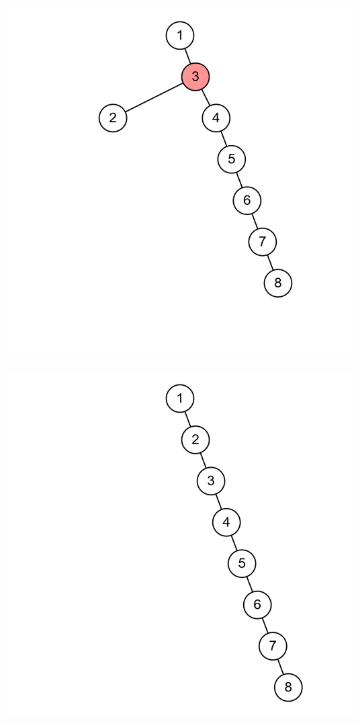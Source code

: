 \documentclass[11pt,a4paper]{article}
\begin{document}
\begin{loesung}
\begin{enumerate}
\begin{figure}[h!]
\begin{subfigure}[b]{0.23\textwidth}
            \end{subfigure}
            \begin{subfigure}[b]{0.23\textwidth}
                \centering
                \includegraphics[width=\textwidth]{img/1b/6}
            \end{subfigure}
            \begin{subfigure}[b]{0.23\textwidth}
                \centering
                \includegraphics[width=\textwidth]{img/1b/7}
            \end{subfigure}
        \end{figure}
        \FloatBarrier


\end{enumerate}
\end{loesung}
\end{document}
